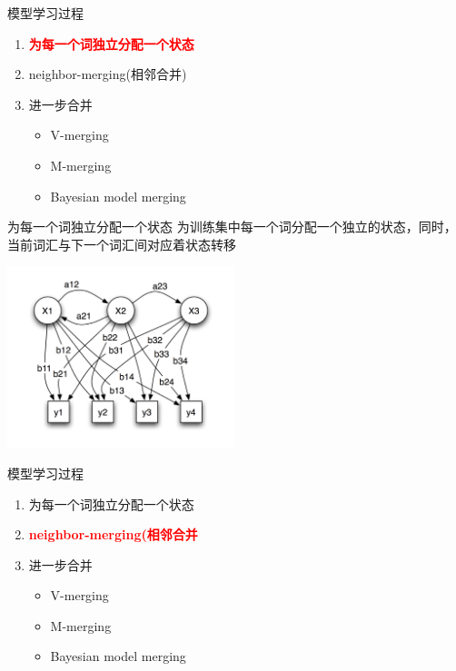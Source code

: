 \documentclass{beamer}
\begin{document}
\begin{frame}{模型学习过程}
    \begin{enumerate}
        \item \textbf{\textcolor{red}{为每一个词独立分配一个状态}}
        \item neighbor-merging(相邻合并)
        \item 进一步合并
            \begin{itemize}
                \item V-merging
                \item M-merging
                \item Bayesian model merging
            \end{itemize}
    \end{enumerate}
\end{frame}

\begin{frame}{为每一个词独立分配一个状态}
    为训练集中每一个词分配一个独立的状态，同时，当前词汇与下一个词汇间对应着状态转移
    \begin{center}
        \includegraphics[height=150pt]{report5/hmm.png}
    \end{center}
    
\end{frame}

\begin{frame}{模型学习过程}
    \begin{enumerate}
        \item 为每一个词独立分配一个状态
        \item \textbf{\textcolor{red}{neighbor-merging(相邻合并}}
        \item 进一步合并
            \begin{itemize}
                \item V-merging
                \item M-merging
                \item Bayesian model merging
            \end{itemize}
    \end{enumerate}
\end{frame}
\end{document}
